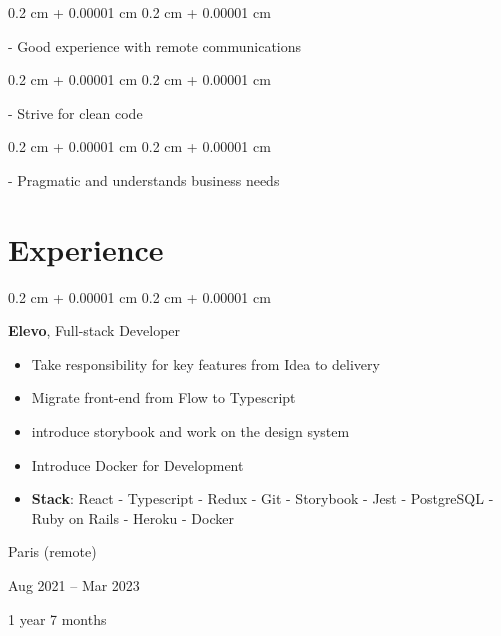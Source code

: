 \documentclass[10pt, letterpaper]{article}
\newenvironment{highlights}{
    \begin{itemize}[
        topsep=0.10 cm,
        parsep=0.10 cm,
        partopsep=0pt,
        itemsep=0pt,
        leftmargin=0.4 cm + 10pt
    ]
}{
    \end{itemize}
} %
\newenvironment{onecolentry}{
    \begin{adjustwidth}{
        0.2 cm + 0.00001 cm
    }{
        0.2 cm + 0.00001 cm
    }
}{
    \end{adjustwidth}
} %
\newenvironment{twocolentry}[2][]{
    \onecolentry
    \def\secondColumn{#2}
    \setcolumnwidth{\fill, 4.5 cm}
    \begin{paracol}{2}
}{
    \switchcolumn \raggedleft \secondColumn
    \end{paracol}
    \endonecolentry
} %
\begin{document}
        \vspace{0.2 cm}

        \begin{onecolentry}
            - Good experience with remote communications
        \end{onecolentry}

        \vspace{0.2 cm}

        \begin{onecolentry}
            - Strive for clean code
        \end{onecolentry}

        \vspace{0.2 cm}

        \begin{onecolentry}
            - Pragmatic and understands business needs
        \end{onecolentry}


    
    \section{Experience}



        
        \begin{twocolentry}{
            Paris (remote)

        Aug 2021 – Mar 2023

        1 year 7 months
        }
            \textbf{Elevo}, Full-stack Developer
            \begin{highlights}
                \item Take responsibility for key features from Idea to delivery
                \item Migrate front-end from Flow to Typescript
                \item introduce storybook and work on the design system
                \item Introduce Docker for Development
                \item \textbf{Stack}:  React - Typescript - Redux - Git - Storybook - Jest - PostgreSQL - Ruby on Rails - Heroku - Docker
            \end{highlights}
        \end{twocolentry}


        \vspace{0.2 cm}
\end{document}
